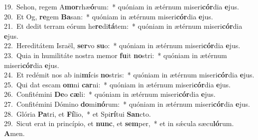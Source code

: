 {19.~}Sehon, regem A\textbf{mor}rhæ\textbf{ó}rum:~* quóniam in ætérnum miseri\textbf{cór}dia \textbf{e}jus.\\
{20.~}Et Og, \textbf{re}gem \textbf{Ba}san:~* quóniam in ætérnum miseri\textbf{cór}dia \textbf{e}jus.\\
{21.~}Et dedit terram eórum he\textbf{re}di\textbf{tá}tem:~* quóniam in ætérnum miseri\textbf{cór}dia \textbf{e}jus.\\
{22.~}Hereditátem Israël, \textbf{ser}vo \textbf{su}o:~* quóniam in ætérnum miseri\textbf{cór}dia \textbf{e}jus.\\
{23.~}Quia in humilitáte nostra memor \textbf{fu}it \textbf{no}stri:~* quóniam in ætérnum miseri\textbf{cór}dia \textbf{e}jus.\\
{24.~}Et redémit nos ab ini\textbf{mí}cis \textbf{no}stris:~* quóniam in ætérnum miseri\textbf{cór}dia \textbf{e}jus.\\
{25.~}Qui dat escam \textbf{om}ni \textbf{car}ni:~* quóniam in ætérnum miseri\textbf{cór}dia \textbf{e}jus.\\
{26.~}Confitémini \textbf{De}o \textbf{cæ}li:~* quóniam in ætérnum miseri\textbf{cór}dia \textbf{e}jus.\\
{27.~}Confitémini Dómino \textbf{do}mi\textbf{nó}rum:~* quóniam in ætérnum miseri\textbf{cór}dia \textbf{e}jus.\\
{28.~}Glória \textbf{Pa}tri, et \textbf{Fí}lio,~* et Spi\textbf{rí}tui \textbf{San}cto.\\
{29.~}Sicut erat in princípio, et \textbf{nunc}, et \textbf{sem}per,~* et in sǽcula sæcu\textbf{ló}rum. \textbf{A}men.\\
